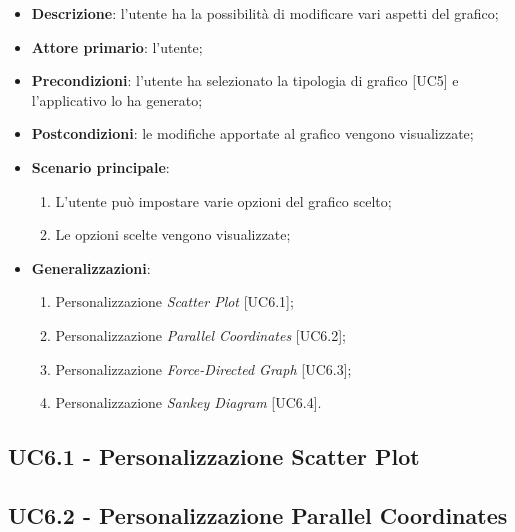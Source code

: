 \begin{itemize}
  \item \textbf{Descrizione}: l'utente ha la possibilità di modificare vari aspetti del grafico;
  \item \textbf{Attore primario}: l'utente;
  \item \textbf{Precondizioni}: l'utente ha selezionato la tipologia di grafico [UC5] e l'applicativo lo ha generato;
  \item \textbf{Postcondizioni}: le modifiche apportate al grafico vengono visualizzate;
  \item \textbf{Scenario principale}: 
   \begin{enumerate}
    \item L'utente può impostare varie opzioni del grafico scelto;
    \item Le opzioni scelte vengono visualizzate;
  \end{enumerate}
  \item \textbf{Generalizzazioni}:
    \begin{enumerate}
      \item Personalizzazione \textit{Scatter Plot} [UC6.1];
      \item Personalizzazione \textit{Parallel Coordinates} [UC6.2];
      \item Personalizzazione \textit{Force-Directed Graph} [UC6.3];
      \item Personalizzazione \textit{Sankey Diagram} [UC6.4].
    \end{enumerate}
\end{itemize}

\subsection{UC6.1 - Personalizzazione Scatter Plot}
\subsection{UC6.2 - Personalizzazione Parallel Coordinates}

